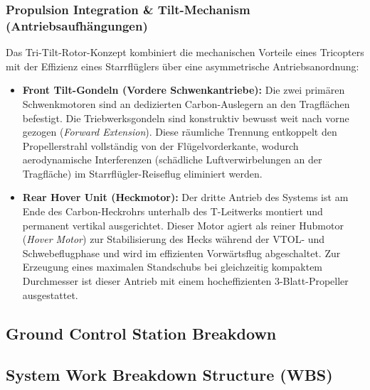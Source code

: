 \subsubsection{Propulsion Integration \& Tilt-Mechanism (Antriebsaufhängungen)}
Das Tri-Tilt-Rotor-Konzept kombiniert die mechanischen Vorteile eines Tricopters mit der Effizienz eines Starrflüglers über eine asymmetrische Antriebsanordnung:
\begin{itemize}
    \item \textbf{Front Tilt-Gondeln (Vordere Schwenkantriebe):} Die zwei primären Schwenkmotoren sind an dedizierten Carbon-Auslegern an den Tragflächen befestigt. Die Triebwerksgondeln sind konstruktiv bewusst weit nach vorne gezogen (\textit{Forward Extension}). Diese räumliche Trennung entkoppelt den Propellerstrahl vollständig von der Flügelvorderkante, wodurch aerodynamische Interferenzen (schädliche Luftverwirbelungen an der Tragfläche) im Starrflügler-Reiseflug eliminiert werden.
    \item \textbf{Rear Hover Unit (Heckmotor):} Der dritte Antrieb des Systems ist am Ende des Carbon-Heckrohrs unterhalb des T-Leitwerks montiert und permanent vertikal ausgerichtet. Dieser Motor agiert als reiner Hubmotor (\textit{Hover Motor}) zur Stabilisierung des Hecks während der VTOL- und Schwebeflugphase und wird im effizienten Vorwärtsflug abgeschaltet. Zur Erzeugung eines maximalen Standschubs bei gleichzeitig kompaktem Durchmesser ist dieser Antrieb mit einem hocheffizienten 3-Blatt-Propeller ausgestattet.
\end{itemize}

\subsection{Ground Control Station Breakdown}

\newpage

\subsection{System Work Breakdown Structure (WBS)}

